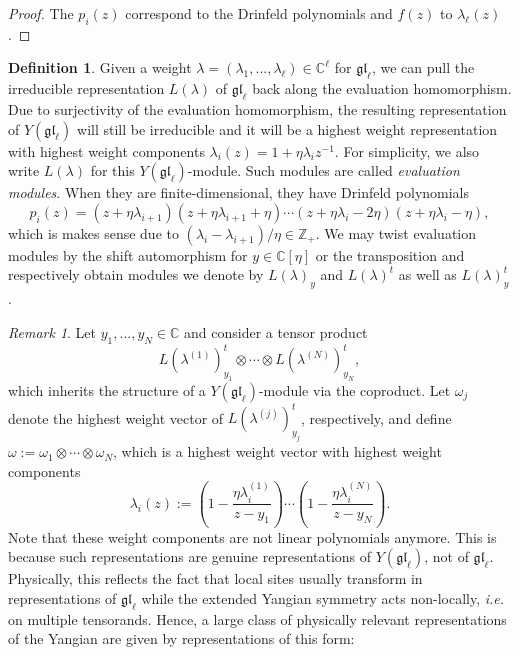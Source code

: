 \documentclass[11pt]{report}
\theoremstyle{definition}
\newtheorem{definition}[theorem]{Definition}
\theoremstyle{remark}
\newtheorem*{remark}{Remark}
\theoremstyle{remark}
\newcommand{\Z}{\mathbb{Z}}
\newcommand{\C}{\mathbb{C}}
\begin{document}
\begin{proof}
The $p_i(z)$ correspond to the Drinfeld polynomials and $f(z)$ to $\lambda_\ell(z)$.
\end{proof}

\begin{definition}
Given a weight $\lambda = (\lambda_1,...,\lambda_\ell) \in \C^\ell$ for $\mathfrak{gl}_\ell$, we can pull the irreducible representation $L(\lambda)$ of $\mathfrak{gl}_\ell$ back along the evaluation homomorphism. Due to surjectivity of the evaluation homomorphism, the resulting representation of $Y(\mathfrak{gl}_\ell)$ will still be irreducible and it will be a highest weight representation with highest weight components $\lambda_i(z) = 1 + \eta \lambda_i z^{-1}$. For simplicity, we also write $L(\lambda)$ for this $Y(\mathfrak{gl}_\ell)$-module. Such modules are called \emph{evaluation modules}. When they are finite-dimensional, they have Drinfeld polynomials
\begin{equation*}
p_i(z) = (z+\eta \lambda_{i+1})(z+\eta \lambda_{i+1}+\eta) \cdots (z+\eta \lambda_i-2\eta)(z+\eta \lambda_i-\eta),
\end{equation*}
which is makes sense due to $(\lambda_i - \lambda_{i+1})/\eta \in \Z_+$. We may twist evaluation modules by the shift automorphism for $y \in \C[\eta]$ or the transposition and respectively obtain modules we denote by $L(\lambda)_y$ and $L(\lambda)^t$ as well as $L(\lambda)_y^t$.
\end{definition}

\begin{remark}
Let $y_1,...,y_N \in \C$ and consider a tensor product
\begin{equation*}
L(\lambda^{(1)})_{y_1}^t \otimes \cdots \otimes L(\lambda^{(N)})_{y_N}^t,
\end{equation*}
which inherits the structure of a $Y(\mathfrak{gl}_\ell)$-module via the coproduct. Let $\omega_j$ denote the highest weight vector of $L(\lambda^{(j)})_{y_j}^t$, respectively, and define $\omega := \omega_1 \otimes \cdots \otimes \omega_N$, which is a highest weight vector with highest weight components
\begin{equation*}
\lambda_i(z) := \left( 1 - \frac{\eta \lambda_i^{(1)}}{z-y_1} \right) \cdots \left( 1 - \frac{\eta \lambda_i^{(N)}}{z-y_N} \right).
\end{equation*}
Note that these weight components are not linear polynomials anymore. This is because such representations are genuine representations of $Y(\mathfrak{gl}_\ell)$, not of $\mathfrak{gl}_\ell$. Physically, this reflects the fact that local sites usually transform in representations of $\mathfrak{gl}_\ell$ while the extended Yangian symmetry acts non-locally, \emph{i.e.} on multiple tensorands. Hence, a large class of physically relevant representations of the Yangian are given by representations of this form:
\end{remark}
\end{document}
